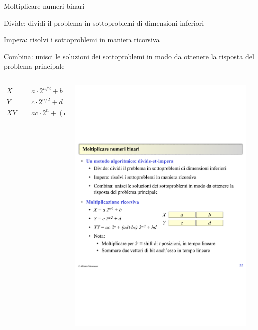\begin{frame}{Moltiplicare numeri binari}

\begin{myboxtitle}
\BI
\item \alert{Divide}: dividi il problema in sottoproblemi di dimensioni inferiori
\item \alert{Impera}: risolvi i sottoproblemi in maniera ricorsiva
\item \alert{Combina}: unisci le soluzioni dei sottoproblemi in modo da ottenere la risposta del problema principale
\EI
\end{myboxtitle}

\begin{myboxtitle}
\begin{columns}[c]
\begin{column}{0.52\textwidth}
\begin{align*}
X &= a \cdot 2^{n/2} + b  \\
Y &= c \cdot 2^{n/2} + d\\
XY &= ac \cdot 2^n + (ad+bc) \cdot 2^{n/2} + bd
\end{align*}
\end{column}
\begin{column}{0.46\textwidth}
\begin{center}
\includegraphics[width=0.95\textwidth]{mul-di.pdf}
\end{center}
\end{column}
\end{columns}
\end{myboxtitle}



\end{frame}
